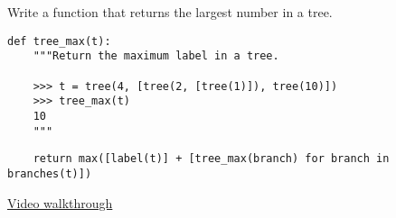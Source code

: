 \question
Write a function that returns the largest number in a tree.
\begin{lstlisting}
def tree_max(t):
    """Return the maximum label in a tree.

    >>> t = tree(4, [tree(2, [tree(1)]), tree(10)])
    >>> tree_max(t)
    10
    """
\end{lstlisting}
\begin{solution}[1in]
\begin{lstlisting}
    return max([label(t)] + [tree_max(branch) for branch in branches(t)])
\end{lstlisting}
\href{https://www.youtube.com/watch?v=VcZPTlE56G8&vq=hd1080&t=49m52s}{Video walkthrough}
\end{solution}
